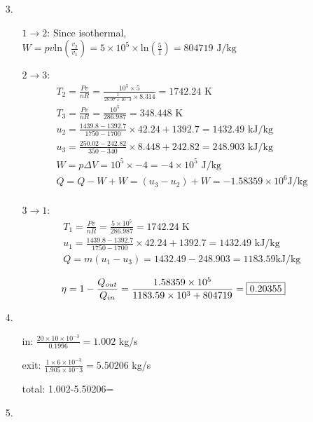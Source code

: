 \documentclass{article}
\begin{document}
\begin{itemize}
\begin{itemize}
    \end{itemize}
    \item [3.] \
    \begin{itemize}
        \item [\(1\rightarrow 2\):] Since isothermal, \(W = pv \text{ln}(\frac{v_2}{v_1}) = 5\times 10^5 \times \text{ln}(\frac{5}{1})= 804719\text { J/kg}\)\\
        \item [\(2\rightarrow 3\):] \begin{align*}
            T_2 = \frac{Pv}{nR}=\frac{10^5\times 5}{\frac{1}{28.97\times 10^-3}\times 8.314} = 1742.24 \text{ K}\\
            T_3 = \frac{Pv}{nR}=\frac{10^5}{286.987}=348.448 \text{ K}\\
            u_2 = \frac{1439.8-1392.7}{1750-1700}\times 42.24 + 1392.7 = 1432.49 \text{ kJ/kg}\\
            u_3 = \frac{250.02-242.82}{350-340}\times 8.448 +242.82 = 248.903\text{ kJ/kg} \\
            W = p\Delta V = 10^5 \times -4 = -4\times 10^5 \text{ J/kg}\\
            Q = Q-W+W = (u_3-u_2)+W = -1.58359\times 10^6 \text{J/kg}\\
        \end{align*}
        \item [\(3\rightarrow 1\):]\begin{align*}
            T_1 = \frac{Pv}{nR} = \frac{5\times 10^5}{286.987}=1742.24 \text{ K}\\
            u_1 = \frac{1439.8-1392.7}{1750-1700}\times 42.24 + 1392.7 = 1432.49 \text{ kJ/kg}\\
            Q = m(u_1-u_3) = 1432.49-248.903 = 1183.59 \text{kJ/kg}
        \end{align*}
    \end{itemize}
    \[\eta = 1-\frac{Q_{out}}{Q_{in}} = \frac{1.58359\times 10^5}{1183.59\times 10^3+804719} = \fbox{0.20355}\]
    \item [4.]\
    \begin{itemize}
        \item [in:] \(\frac{20\times 10\times10^{-3}}{0.1996}=1.002\) kg/s
        \item [exit:] \(\frac{1\times 6\times 10^{-3}}{1.905\times 10^-3}=5.50206\) kg/s
        \item [total:] 1.002-5.50206=\fbox{-4.5006 kg/s}
    \end{itemize}
    \item [5.]
\end{itemize}
\end{document}
